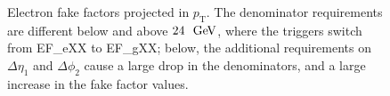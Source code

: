 \begin{figure}[h] 
  \centering
  \caption{Electron fake factors projected in $p_{\mathrm{T}}$. The denominator requirements are different below and above $24~\GeV$, where the triggers switch from EF\_eXX to EF\_gXX; below, the additional requirements on $\Delta\eta_1$ and $\Delta\phi_2$ cause a large drop in the denominators, and a large increase in the fake factor values.}
  \label{fig:electron-fake-factors-1D-pt}
\end{figure}

